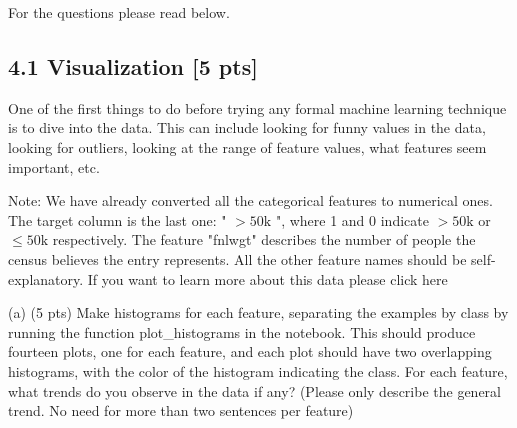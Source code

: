 \documentclass[10pt]{article}
\begin{document}
For the questions please read below.

\subsection*{4.1 Visualization [5 pts]}
One of the first things to do before trying any formal machine learning technique is to dive into the data. This can include looking for funny values in the data, looking for outliers, looking at the range of feature values, what features seem important, etc.

Note: We have already converted all the categorical features to numerical ones. The target column is the last one: " $>50 \mathrm{k}$ ", where 1 and 0 indicate $>50 \mathrm{k}$ or $\leq 50 \mathrm{k}$ respectively. The feature "fnlwgt" describes the number of people the census believes the entry represents. All the other feature names should be self-explanatory. If you want to learn more about this data please click here

(a) (5 pts) Make histograms for each feature, separating the examples by class by running the function plot\_histograms in the notebook. This should produce fourteen plots, one for each feature, and each plot should have two overlapping histograms, with the color of the histogram indicating the class. For each feature, what trends do you observe in the data if any? (Please only describe the general trend. No need for more than two sentences per feature)
\end{document}
